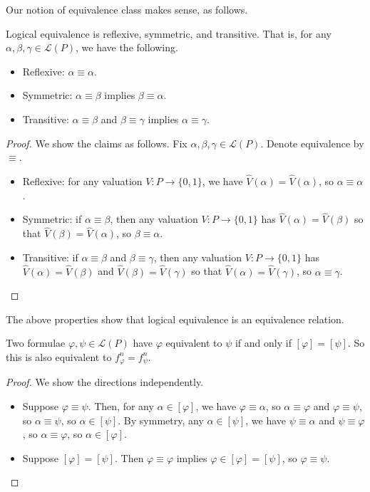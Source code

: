Our notion of equivalence class makes sense, as follows.
\begin{prop}
	Logical equivalence is reflexive, symmetric, and transitive. That is, for any $\alpha,\beta,\gamma\in\mathcal L(P)$, we have the following.
	\begin{itemize}
		\item Reflexive: $\alpha\equiv\alpha$.
		\item Symmetric: $\alpha\equiv\beta$ implies $\beta\equiv\alpha$.
		\item Transitive: $\alpha\equiv\beta$ and $\beta\equiv\gamma$ implies $\alpha\equiv\gamma$.
	\end{itemize}
\end{prop}
\begin{proof}
	We show the claims as follows. Fix $\alpha,\beta,\gamma\in\mathcal L(P)$. Denote equivalence by $\equiv$.
	\begin{itemize}
		\item Reflexive: for any valuation $V:P\to\{0,1\}$, we have $\hat V(\alpha)=\hat V(\alpha)$, so $\alpha\equiv\alpha$.
		\item Symmetric: if $\alpha\equiv\beta$, then any valuation $V:P\to\{0,1\}$ has $\hat V(\alpha)=\hat V(\beta)$ so that $\hat V(\beta)=\hat V(\alpha)$, so $\beta\equiv\alpha$.
		\item Transitive: if $\alpha\equiv\beta$ and $\beta\equiv\gamma$, then any valuation $V:P\to\{0,1\}$ has $\hat V(\alpha)=\hat V(\beta)$ and $\hat V(\beta)=\hat V(\gamma)$ so that $\hat V(\alpha)=\hat V(\gamma)$, so $\alpha\equiv\gamma$.
		\qedhere
	\end{itemize}
\end{proof}
\begin{remark}
	The above properties show that logical equivalence is an equivalence relation.
\end{remark}
\begin{corollary}
	Two formulae $\varphi,\psi\in\mathcal L(P)$ have $\varphi$ equivalent to $\psi$ if and only if $[\varphi]=[\psi]$. So this is also equivalent to $f_\varphi^n=f_\psi^n$.
\end{corollary}
\begin{proof}
	We show the directions independently.
	\begin{itemize}
		\item Suppose $\varphi\equiv\psi$. Then, for any $\alpha\in[\varphi]$, we have $\varphi\equiv\alpha$, so $\alpha\equiv\varphi$ and $\varphi\equiv\psi$, so $\alpha\equiv\psi$, so $\alpha\in[\psi]$. By symmetry, any $\alpha\in[\psi]$, we have $\psi\equiv\alpha$ and $\psi\equiv\varphi$, so $\alpha\equiv\varphi$, so $\alpha\in[\varphi]$.
		\item Suppose $[\varphi]=[\psi]$. Then $\varphi\equiv\varphi$ implies $\varphi\in[\varphi]=[\psi]$, so $\varphi\equiv\psi$.
		\qedhere
	\end{itemize}
\end{proof}

